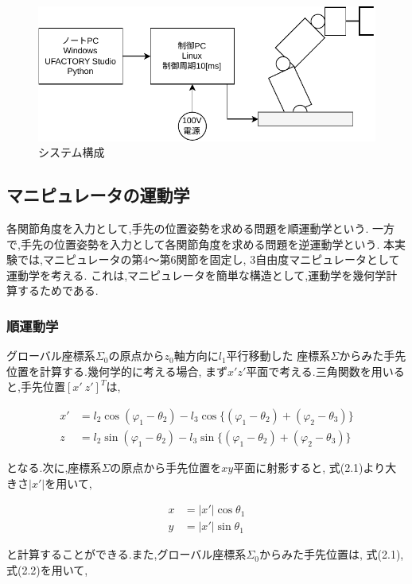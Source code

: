\begin{figure}[h]
  \centering
  \includegraphics[scale=1]{sozai/1.pdf}
  \caption{システム構成}
\end{figure}


\subsection{マニピュレータの運動学}
各関節角度を入力として,手先の位置姿勢を求める問題を順運動学という.
一方で,手先の位置姿勢を入力として各関節角度を求める問題を逆運動学という.
本実験では,マニピュレータの第4～第6関節を固定し,
3自由度マニピュレータとして運動学を考える.
これは,マニピュレータを簡単な構造として,運動学を幾何学計算するためである.

\subsubsection{順運動学}
グローバル座標系$\Sigma_0$の原点から$z_0$軸方向に$l_1$平行移動した
座標系$\Sigma$からみた手先位置を計算する.幾何学的に考える場合,
まず$x'z'$平面で考える.三角関数を用いると,手先位置$[x' \ z']^T$は,

\begin{align}
  x' & = l_2 \cos (\varphi_1 - \theta_2) - l_3 \cos \{ (\varphi_1 - \theta_2) + (\varphi_2 - \theta_3) \} \tag{2.1} \\
  z  & = l_2 \sin (\varphi_1 - \theta_2) - l_3 \sin \{ (\varphi_1 - \theta_2) + (\varphi_2 - \theta_3) \} 
\end{align}

となる.次に,座標系$\Sigma$の原点から手先位置を$xy$平面に射影すると,
式(2.1)より大きさ$|x'|$を用いて,

\begin{align}
  x & = |x'| \cos \theta_1 \tag{2.2} \\
  y & = |x'| \sin \theta_1 
\end{align}

と計算することができる.また,グローバル座標系$\Sigma_0$からみた手先位置は,
式(2.1),式(2.2)を用いて,

